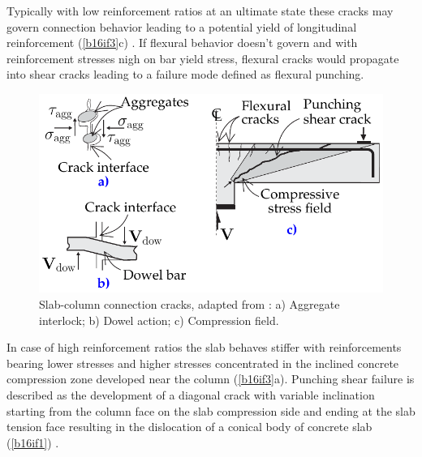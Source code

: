 \documentclass[twocolumn]{article} %
\begin{document}
Typically with low reinforcement ratios at an ultimate state these cracks may govern connection behavior leading to a potential yield of longitudinal reinforcement (\ref{b16if3}c) \citep{hallgren1996punching}.  If flexural behavior doesn't govern and with reinforcement stresses nigh on bar yield stress, flexural cracks would propagate into shear cracks leading to a failure mode defined as flexural punching\citep{fib2001}.

    \begin{figure}\centering
        \includegraphics[width=\columnwidth]{Figures/tikzout/b16if2.pdf}\caption{Slab-column connection cracks, adapted from \cite{bompa2016b}: a) Aggregate interlock; b) Dowel action; c) Compression field.}\label{b16if2}
        \end{figure}

In case of high reinforcement ratios the slab behaves stiffer with reinforcements bearing lower stresses and higher stresses concentrated in the inclined concrete compression zone developed near the column (\ref{b16if3}a)\citep{hallgren1996punching}. Punching shear failure is described as the development of a diagonal crack with variable inclination starting from the column face on the slab compression side and ending at the slab tension face resulting in the dislocation of a conical body of concrete slab (\ref{b16if1}) \citep{regan1986}.
\end{document}
